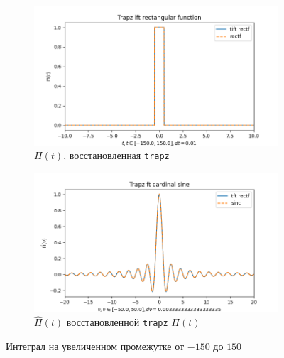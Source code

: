 \documentclass[a4paper, 12pt]{article}
\begin{document}
    \vspace{-5mm}
    \begin{figure}[H]
        \centering
        \begin{subfigure}{0.45\textwidth}
            \centering
            \includegraphics[width=\linewidth]{4_tiftr.png}
            \caption{$\Pi(t)$, восстановленная \texttt{trapz}}
            \label{fig:trectf4}
        \end{subfigure}
        \hspace{5mm}
        \begin{subfigure}{0.45\textwidth}
            \centering
            \includegraphics[width=\linewidth]{4_tftr.png}
            \caption{$\hat{\Pi}(t)$ восстановленной \texttt{trapz} $\Pi(t)$}
            \label{fig:tsinc4}
        \end{subfigure}
        \caption{Интеграл на увеличенном промежутке от $-150$ до $150$}
        \label{fig:trapzs4}
    \end{figure}
    \vspace{-5mm}
\end{document}
